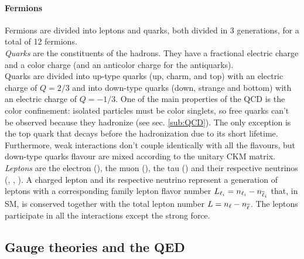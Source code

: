 \paragraph*{Fermions}
Fermions are divided into leptons and quarks, both divided in 3 generations, for a total of 12 fermions.\\
\emph{Quarks} are the constituents of the hadrons. They have a fractional electric charge and a color charge (and an anticolor charge for the antiquarks).\\
Quarks are divided into up-type quarks (up, charm, and top) with an electric charge of $Q=2/3$ and into down-type quarks (down, strange and bottom) with an electric charge of $Q=-1/3$.
One of the main properties of the QCD is the color confinement: isolated particles must be color singlets, so free quarks can't be observed because they hadronize (see sec. \ref{sub:QCD}).
The only exception is the top quark that decays before the hadronization due to its short lifetime.\\
Furthermore, weak interactions don't couple identically with all the flavours, but down-type quarks flavour are mixed according to the unitary CKM matrix.\\
\emph{Leptons} are the electron (\Pe), the muon (\PGm), the tau (\PGt) and their respective neutrinos (\PGne, \PGnGm, \PGnGt).
A charged lepton and its respective neutrino represent a generation of leptons with a corresponding family lepton flavor number $L_{\ell_i}=n_{\ell_i}-n_{{\overline{\ell}}_i}$ that, in SM, is conserved together with the total lepton number $L=n_\ell-n_{\overline{\ell}}$.
The leptons participate in all the interactions except the strong force.\\


\subsection{Gauge theories and the QED}\label{sub:gauge_qed}
